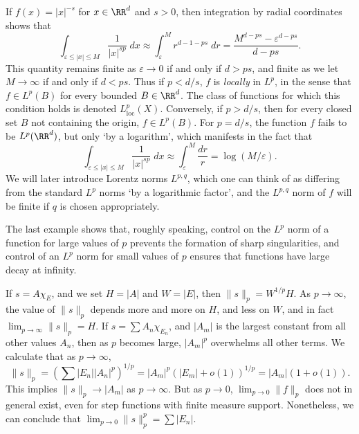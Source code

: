 \begin{example}
  If $f(x) = |x|^{-s}$ for $x \in \RR^d$ and $s > 0$, then integration by radial coordinates shows that
  \[ \int_{\varepsilon \leq |x| \leq M} \frac{1}{|x|^{s p}}\; dx \approx \int_\varepsilon^M r^{d-1 - ps}\; dr = \frac{M^{d - p s} - \varepsilon^{d - p s}}{d - p s}. \]
  This quantity remains finite as $\varepsilon \to 0$ if and only if $d > p s$, and finite as we let $M \to \infty$ if and only if $d < p s$. Thus if $p < d/s$, $f$ is \emph{locally} in $L^p$, in the sense that $f \in L^p(B)$ for every bounded $B \in \RR^d$. The class of functions for which this condition holds is denoted $L^p_{\text{loc}}(X)$. Conversely, if $p > d/s$, then for every closed set $B$ not containing the origin, $f \in L^p(B)$. For $p = d/s$, the function $f$ fails to be $L^p(\RR^d)$, but only `by a logarithm', which manifests in the fact that
  \[ \int_{\varepsilon \leq |x| \leq M} \frac{1}{|x|^{s p}}\; dx \approx \int_\varepsilon^M \frac{dr}{r} = \log(M/\varepsilon). \]
  We will later introduce Lorentz norms $L^{p,q}$, which one can think of as differing from the standard $L^p$ norms `by a logarithmic factor', and the $L^{p,q}$ norm of $f$ will be finite if $q$ is chosen appropriately.
\end{example}

The last example shows that, roughly speaking, control on the $L^p$ norm of a function for large values of $p$ prevents the formation of sharp singularities, and control of an $L^p$ norm for small values of $p$ ensures that functions have large decay at infinity.

\begin{example}
  If $s = A \chi_E$, and we set $H = |A|$ and $W = |E|$, then $\| s \|_p = W^{1/p} H$. As $p \to \infty$, the value of $\| s \|_p$ depends more and more on $H$, and less on $W$, and in fact $\lim_{p \to \infty} \| s \|_p = H$. If $s = \sum A_n \chi_{E_n}$, and $|A_m|$ is the largest constant from all other values $A_n$, then as $p$ becomes large, $|A_m|^p$ overwhelms all other terms. We calculate that as $p \to \infty$,
  \[ \| s \|_p = \left( \sum |E_n| |A_n|^p \right)^{1/p} = |A_m|^p (|E_m| + o(1))^{1/p} = |A_m| (1 + o(1)). \]
  This implies $\| s \|_p \to |A_m|$ as $p \to \infty$. But as $p \to 0$, $\lim_{p \to 0} \| f \|_p$ does not in general exist, even for step functions with finite measure support. Nonetheless, we can conclude that $\lim_{p \to 0} \| s \|_p^p = \sum |E_n|$.
\end{example}

